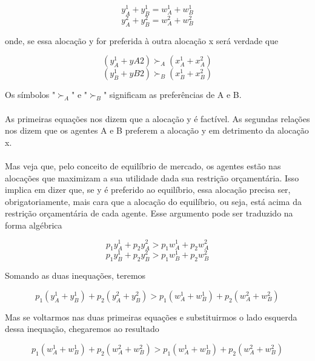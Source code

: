 \documentclass[a4paper,11pt,oneside]{book}
\theoremstyle{definition}
\theoremstyle{break}
\begin{document}
\newpage

$$y_A^1 + y_B^1 = w_A^1 + w_ B^1$$
$$y_A^2 + y_B^2 = w_A^2 + w_ B^2$$

onde, se essa alocação y for preferida à outra alocação x será verdade que

$$(y_A^1 + yA2) \succ_A (x_A^1 + x_A^2)$$
$$(y_B^1 + yB2) \succ_B (x_B^1 + x_B^2)$$

Os símbolos "$\succ_A$" e "$\succ_B$" significam as preferências de A e B.
\\~\\
As primeiras equações nos dizem que a alocação y é factível. As segundas relações nos dizem que os agentes A e B preferem a alocação y em detrimento da alocação x.
\\~\\
Mas veja que, pelo conceito de equilíbrio de mercado, os agentes estão nas alocações que maximizam a sua utilidade dada sua restrição orçamentária. Isso implica em dizer que, se y é preferido ao equilíbrio, essa alocação precisa ser, obrigatoriamente, mais cara que a alocação do equilíbrio, ou seja, está acima da restrição orçamentária de cada agente. Esse argumento pode ser traduzido na forma algébrica

$$p_1y_A^1 + p_2y_A^2 > p_1w_A^1 + p_2w_A^2$$
$$p_1y_B^1 + p_2y_B^2 > p_1w_B^1 + p_2w_B^2$$

Somando as duas inequações, teremos

$$p_1(y_A^1 + y_B^1) + p_2(y_A^2 + y_B^2) > p_1(w_A^1 + w_ B^1) + p_2(w_A^2 + w_ B^2)$$

Mas se voltarmos nas duas primeiras equações e substituirmos o lado esquerda dessa inequação, chegaremos ao resultado

$$p_1(w_A^1 + w_ B^1) + p_2(w_A^2 + w_ B^2) > p_1(w_A^1 + w_ B^1) + p_2(w_A^2 + w_ B^2)$$
\end{document}
